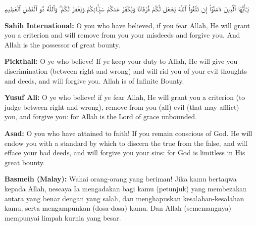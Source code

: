 \documentclass[11pt,a4paper,openany]{book}
\let\textAR\textarabic
\newcommand{\quranverse}[1]{{\centering\Large\textAR{#1}\par}}
\begin{document}
\begin{quranbox}[Qur'an 8:29]
\quranverse{يَـٰٓأَيُّهَا ٱلَّذِينَ ءَامَنُوٓا۟ إِن تَتَّقُوا۟ ٱللَّهَ يَجْعَل لَّكُمْ فُرْقَانًا وَيُكَفِّرْ عَنكُمْ سَيِّـَٔاتِكُمْ وَيَغْفِرْ لَكُمْ ۗ وَٱللَّهُ ذُو ٱلْفَضْلِ ٱلْعَظِيمِ}

\vspace{6pt}
\noindent\textbf{Sahih International:} O you who have believed, if you fear Allah, He will grant you a criterion and will remove from you your misdeeds and forgive you. And Allah is the possessor of great bounty.

\vspace{4pt}
\noindent\textbf{Pickthall:} O ye who believe! If ye keep your duty to Allah, He will give you discrimination (between right and wrong) and will rid you of your evil thoughts and deeds, and will forgive you. Allah is of Infinite Bounty.

\vspace{4pt}
\noindent\textbf{Yusuf Ali:} O ye who believe! if ye fear Allah, He will grant you a criterion (to judge between right and wrong), remove from you (all) evil (that may afflict) you, and forgive you: for Allah is the Lord of grace unbounded.

\vspace{4pt}
\noindent\textbf{Asad:} O you who have attained to faith! If you remain conscious of God. He will endow you with a standard by which to discern the true from the false, and will efface your bad deeds, and will forgive you your sins: for God is limitless in His great bounty.

\vspace{4pt}
\noindent\textbf{Basmeih (Malay):} Wahai orang-orang yang beriman! Jika kamu bertaqwa kepada Allah, nescaya Ia mengadakan bagi kamu (petunjuk) yang membezakan antara yang benar dengan yang salah, dan menghapuskan kesalahan-kesalahan kamu, serta mengampunkan (dosa-dosa) kamu. Dan Allah (sememangnya) mempunyai limpah kurnia yang besar.
\end{quranbox}
\end{document}
